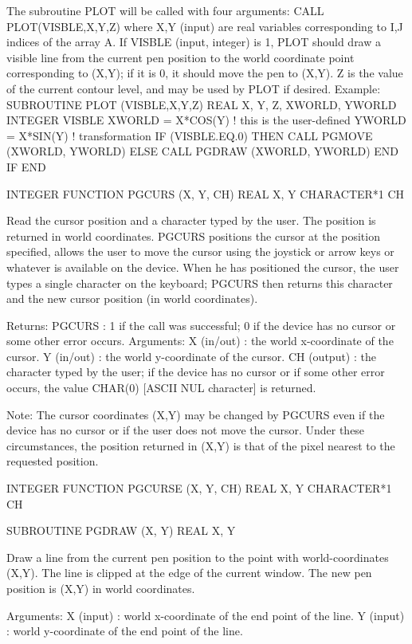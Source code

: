 {The subroutine PLOT will be called with four arguments:
     CALL PLOT(VISBLE,X,Y,Z)
where X,Y (input) are real variables corresponding to
I,J indices of the array A. If  VISBLE (input, integer) is 1,
PLOT should draw a visible line from the current pen
position to the world coordinate point corresponding to (X,Y);
if it is 0, it should move the pen to (X,Y). Z is the value
of the current contour level, and may be used by PLOT if desired.
Example:
      SUBROUTINE PLOT (VISBLE,X,Y,Z)
      REAL X, Y, Z, XWORLD, YWORLD
      INTEGER VISBLE
      XWORLD = X*COS(Y) ! this is the user-defined
      YWORLD = X*SIN(Y) ! transformation
      IF (VISBLE.EQ.0) THEN
          CALL PGMOVE (XWORLD, YWORLD)
      ELSE
          CALL PGDRAW (XWORLD, YWORLD)
      END IF
      END
\endtt}

{\eightpoint\begintt
      INTEGER FUNCTION PGCURS (X, Y, CH)
      REAL X, Y
      CHARACTER*1 CH
 
Read the cursor position and a character typed by the user.
The position is returned in world coordinates.  PGCURS positions
the cursor at the position specified, allows the user to move the
cursor using the joystick or arrow keys or whatever is available on
the device. When he has positioned the cursor, the user types a
single character on the keyboard; PGCURS then returns this
character and the new cursor position (in world coordinates).
 
Returns:
 PGCURS         : 1 if the call was successful; 0 if the device
                   has no cursor or some other error occurs.
Arguments:
 X      (in/out) : the world x-coordinate of the cursor.
 Y      (in/out) : the world y-coordinate of the cursor.
 CH     (output) : the character typed by the user; if the device has
                   no cursor or if some other error occurs, the value
                   CHAR(0) [ASCII NUL character] is returned.
 
Note: The cursor coordinates (X,Y) may be changed by PGCURS even if
the device has no cursor or if the user does not move the cursor.
Under these circumstances, the position returned in (X,Y) is that of
the pixel nearest to the requested position.
\endtt}

{\eightpoint\begintt
      INTEGER FUNCTION PGCURSE (X, Y, CH)
      REAL X, Y
      CHARACTER*1 CH
\endtt}

{\eightpoint\begintt
      SUBROUTINE PGDRAW (X, Y)
      REAL X, Y
 
Draw a line from the current pen position to the point
with world-coordinates (X,Y). The line is clipped at the edge of the
current window. The new pen position is (X,Y) in world coordinates.
 
Arguments:
 X      (input)  : world x-coordinate of the end point of the line.
 Y      (input)  : world y-coordinate of the end point of the line.
\endtt}

